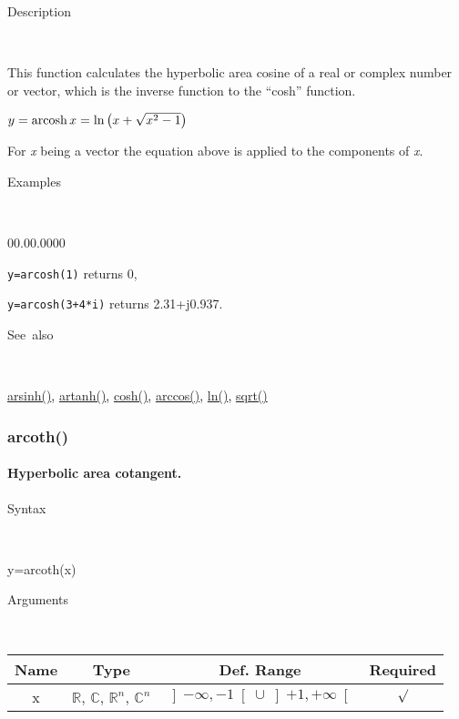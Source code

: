 \begin{description}
\item [Description]~
\end{description}
This function calculates the hyperbolic area cosine of a real or complex
number or vector, which is the inverse function to the {}``cosh''
function.

\medskip{}
$y=\textrm{arcosh\,}x=\ln\left(x+\sqrt{x^{2}-1}\right)$ 
\medskip{}

For \textit{x} being a vector the equation above is applied
to the components of \textit{x}.

\begin{description}
\item [Examples]~
\end{description}
\begin{lyxlist}{00.00.0000}
\item [\texttt{y=arcosh(1)}]returns 0,
\item [\texttt{y=arcosh(3+4{*}i)}]returns 2.31+j0.937.
\end{lyxlist}
\begin{description}
\item [See~also]~
\end{description}
\textcolor{blue}{\hyperlink{arsinh}{arsinh()}}\textcolor{black}{,}
\textcolor{blue}{\hyperlink{artanh}{artanh()}}\textcolor{black}{,}
\textcolor{blue}{\hyperlink{cosh}{cosh()}}\textcolor{black}{,} \textcolor{blue}{\hyperlink{arccos}{arccos()}}\textcolor{black}{,}
\textcolor{blue}{\hyperlink{ln}{ln()}}\textcolor{black}{,} \textcolor{blue}{\hyperlink{sqrt}{sqrt()}}


\newpage
\subsubsection*{\hypertarget{arcoth}{}{\Large arcoth()}}


\paragraph{\label{par:Hyperbolic-area-cotangent}Hyperbolic area cotangent.}

\begin{description}
\item [Syntax]~
\end{description}
y=arcoth(x)

\begin{description}
\item [Arguments]~
\end{description}
\begin{tabular}{|c|c|c|c|}
\hline 
Name&
Type&
Def. Range&
Required\tabularnewline
\hline
\hline 
x&
$\mathbb{R}$, $\mathbb{C}$, $\mathbb{R}^{n}$, $\mathbb{C}^{n}$&
$\left]-\infty,-1\right[\cup\left]+1,+\infty\right[$&
$\surd$\tabularnewline
\hline
\end{tabular}

